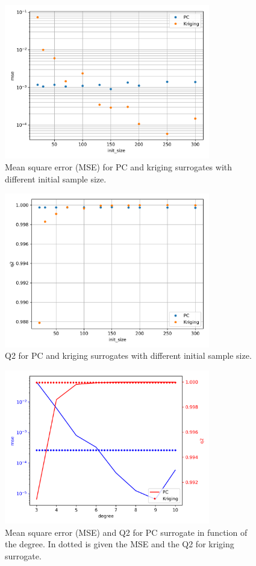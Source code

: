 \documentclass[hidelinks,12pt]{article}
\begin{document}
%


\begin{figure}
  \centering
  \includegraphics[width=0.8\textwidth]{images/init_size_mse.png}
  \caption{Mean square error (MSE) for PC and kriging surrogates with different initial sample size.}
  	\label{init_size_mse}
\end{figure}
\begin{figure}
  \centering
  \includegraphics[width=0.8\textwidth]{images/init_size_q2.png}
  \caption{Q2 for PC and kriging surrogates with different initial sample size.}
  	\label{init_size_q2}
\end{figure}
\begin{figure}
  \centering
  \includegraphics[width=0.8\textwidth]{images/degree.png}
  \caption{Mean square error (MSE) and Q2 for PC surrogate in function of the degree. In dotted is given the MSE and the Q2 for kriging surrogate.}
  	\label{init_size_q2}
\end{figure}
\end{document}
